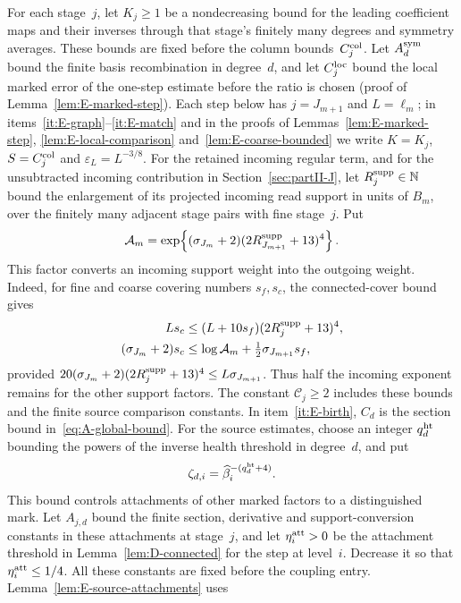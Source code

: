 For each stage~$j$, let $K_j\ge1$ be a nondecreasing bound for the leading coefficient maps and their inverses through that stage's finitely many degrees and symmetry averages. These bounds are fixed before the column bounds~$C^{\rm col}_j$. Let $A_d^{\rm sym}$ bound the finite basis recombination in degree~$d$, and let $C_j^{\rm loc}$ bound the local marked error of the one-step estimate before the ratio is chosen (proof of Lemma~\ref{lem:E-marked-step}). Each step below has $j=J_{m+1}$ and $L=\ell_m$; in items~\ref{it:E-graph}--\ref{it:E-match} and in the proofs of Lemmas~\ref{lem:E-marked-step}, \ref{lem:E-local-comparison} and~\ref{lem:E-coarse-bounded} we write $K=K_j$, $S=C^{\rm col}_j$ and $\varepsilon_L=L^{-3/8}$. For the retained incoming regular term, and for the unsubtracted incoming contribution in Section~\ref{sec:partII-J}, let $R_j^{\rm supp}\in\mathbb{N}$ bound the enlargement of its projected incoming read support in units of $B_m$, over the finitely many adjacent stage pairs with fine stage~$j$. Put
\begin{equation}\label{eq:E-support-conversion}
 \mathcal A_m=\exp\!\left\{(\sigma_{J_m}+2)(2R_{J_{m+1}}^{\rm supp}+13)^4\right\}.
\end{equation}
This factor converts an incoming support weight into the outgoing weight. Indeed, for fine and coarse covering numbers $s_f,s_c$, the connected-cover bound gives
\begin{align*}
 Ls_c&\le(L+10s_f)(2R_j^{\rm supp}+13)^4,\\
 (\sigma_{J_m}+2)s_c
 &\le\log\mathcal A_m+\tfrac12\sigma_{J_{m+1}}s_f,
\end{align*}
provided $20(\sigma_{J_m}+2)(2R_j^{\rm supp}+13)^4\le L\sigma_{J_{m+1}}$. Thus half the incoming exponent remains for the other support factors. The constant $\mathcal C_j\ge2$ includes these bounds and the finite source comparison constants. In item~\ref{it:E-birth}, $C_d$ is the section bound in~\eqref{eq:A-global-bound}.
For the source estimates, choose an integer $q^{\rm ht}_d$ bounding the powers of the inverse health threshold in degree~$d$, and put
\begin{equation*}
 \zeta_{d,i}=\widehat\beta_i^{-(q^{\rm ht}_d+4)}.
\end{equation*}
This bound controls attachments of other marked factors to a distinguished mark. Let $A_{j,d}$ bound the finite section, derivative and support-conversion constants in these attachments at stage~$j$, and let $\eta^{\rm att}_i>0$ be the attachment threshold in Lemma~\ref{lem:D-connected} for the step at level~$i$. Decrease it so that $\eta^{\rm att}_i\le1/4$. All these constants are fixed before the coupling entry. Lemma~\ref{lem:E-source-attachments} uses

